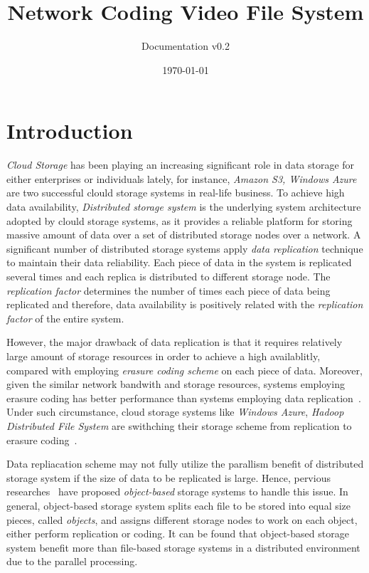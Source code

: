 \documentclass{article}
\title{Network Coding Video File System}
\author{Documentation v0.2}
\date{\today}
\begin{document}
\maketitle

\section{Introduction}
\textit{Cloud Storage} has been playing an increasing significant
role in data storage for either enterprises or individuals lately,
for instance, \textit{Amazon S3, Windows Azure} are two successful
clould storage systems in real-life business.
To achieve high data availability, \textit{Distributed storage system} 
is the underlying system architecture adopted by clould storage systems,
as it provides a reliable platform for storing
massive amount of data over a set of distributed storage nodes over a 
network. A significant number of distributed storage systems apply 
\textit{data replication} technique to maintain their data
reliability. Each piece of data in the system is replicated several 
times and each replica is distributed to different storage node. 
The \textit{replication factor} determines the number of times each 
piece of data being replicated and therefore, 
data availability is positively related with
the \textit{replication factor} of the entire system. 

However, the major drawback of data replication is that it requires 
relatively large amount of storage resources in order to achieve a 
high availablitly, compared with employing \textit{erasure coding scheme} on
each piece of data. 
Moreover, given the similar network bandwith and storage resources, 
systems employing erasure coding has better performance 
than systems employing data replication~\cite{Weatherspoon:2002:ECV:646334.687814}.
Under such circumstance, cloud storage systems like \textit{Windows Azure},
\textit{Hadoop Distributed File System} are swithching their storage scheme
from replication to erasure coding~\cite{Huang:2012:ECW:2342821.2342823,
hdfs:raid}.

Data repliacation scheme may not fully utilize the parallism benefit of
distributed storage system if the size of data to be replicated is large. 
Hence, pervious researches~\cite{Mesnier03object-basedstorage,Wang04obfs:a} 
have proposed \textit{object-based} storage
systems to handle this issue. In general, object-based storage system splits 
each file to be stored into equal size pieces, called \textit{objects}, 
and assigns different storage
nodes to work on each object, either perform replication or coding. It can
be found that object-based storage system benefit more than file-based storage
systems in a distributed environment due to the parallel processing.
\end{document}
